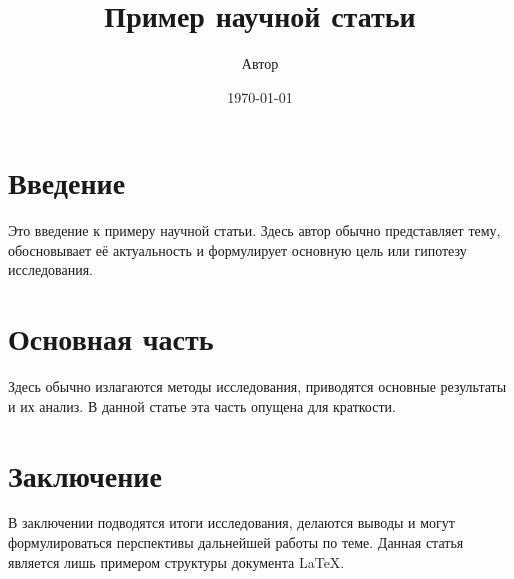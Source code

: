 \documentclass{article}
\title{Пример научной статьи}
\author{Автор}
\date{\today}
\begin{document}
\maketitle

\section{Введение}

Это введение к примеру научной статьи. Здесь автор обычно представляет тему, обосновывает её актуальность и формулирует основную цель или гипотезу исследования.

\section{Основная часть}

Здесь обычно излагаются методы исследования, приводятся основные результаты и их анализ. В данной статье эта часть опущена для краткости.

\section{Заключение}

В заключении подводятся итоги исследования, делаются выводы и могут формулироваться перспективы дальнейшей работы по теме. Данная статья является лишь примером структуры документа LaTeX.
\end{document}

